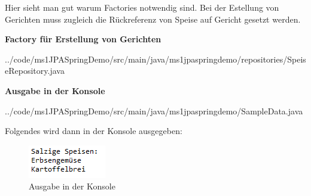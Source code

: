Hier sieht man gut warum Factories notwendig sind. 
Bei der Estellung von Gerichten muss zugleich die R\"uckreferenz von 
Speise auf Gericht gesetzt werden.

\begin{mdframed}[style=codebox]
\textbf{Factory für Erstellung von Gerichten}

{../code/ms1JPASpringDemo/src/main/java/ms1jpaspringdemo/repositories/SpeiseRepository.java}
\end{mdframed}

\begin{mdframed}[style=codebox]
\textbf{Ausgabe in der Konsole}

{../code/ms1JPASpringDemo/src/main/java/ms1jpaspringdemo/SampleData.java}
\end{mdframed}

Folgendes wird dann in der Konsole ausgegeben:

\begin{figure}[H]
\centering
\includegraphics{ms1/screenshots/console.PNG}
\caption{Ausgabe in der Konsole}
\end{figure}

 


